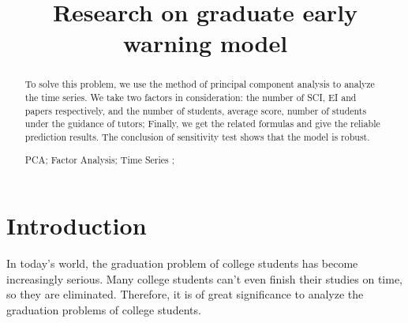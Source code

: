 \documentclass{mcmthesis}
\begin{document}

\begin{abstract}

	To solve this problem, we use the method of principal component analysis
	to analyze the time series. We take two factors in consideration: the
	number of SCI, EI and papers respectively, and the number of students,
	average score, number of students under the guidance of tutors; Finally,
	we get the related formulas and give the reliable prediction results.
	The conclusion of sensitivity test shows that the model is robust.

	\begin{keywords}
		PCA; Factor Analysis; Time Series ;
	\end{keywords}

\end{abstract}

\title{\textbf{Research on graduate early warning model}}
\maketitle


\tableofcontents

\newpage

\listoffigures
\listoftables
\listofexercises

\newpage

\section{Introduction}%
\label{sec:Introduction}

In today's world, the graduation problem of college students has become
increasingly serious. Many college students can't even finish their studies on
time, so they are eliminated. Therefore, it is of great significance to analyze
the graduation problems of college students.
\end{document}
